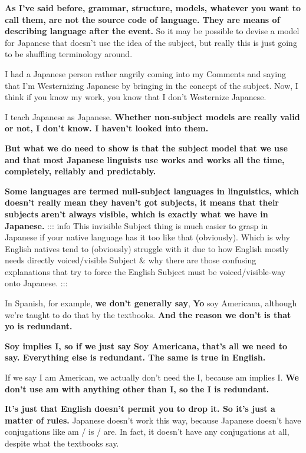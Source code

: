 {\bf As I've said before, grammar, structure, models, whatever you want to call them, are not the source code of language. They are means of describing language after the event.} So it may be possible to devise a model for Japanese that doesn't use the idea of the subject, but really this is just going to be shuffling terminology around.

I had a Japanese person rather angrily coming into my Comments and saying that I'm Westernizing Japanese by bringing in the concept of the subject. Now, I think if you know my work, you know that I don't Westernize Japanese.

I teach Japanese as Japanese. {\bf Whether non-subject models are really valid or not, I don't know. I haven't looked into them.}

{\bf But what we do need to show is that the subject model that we use and that most Japanese linguists use works and works all the time, completely, reliably and predictably.}

\startsectionlevel[title={The Null-Subject},reference={the-null-subject}]

{\bf Some languages are termed null-subject languages in linguistics, which doesn't really mean they haven't got subjects, it means that their subjects aren't always visible, which is exactly what we have in Japanese.} ::: info This invisible Subject thing is much easier to grasp in Japanese if your native language has it too like that (obviously). Which is why English natives tend to (obviously) struggle with it due to how English mostly needs directly voiced/visible Subject & why there are those confusing explanations that try to force the English Subject must be voiced/visible-way onto Japanese. ::: {}

In Spanish, for example, {\bf we don't generally say}, {\bf Yo} soy Americana, although we're taught to do that by the textbooks. {\bf And the reason we don't is that yo is redundant.}

{\bf Soy implies I, so if we just say Soy Americana, that's all we need to say. Everything else is redundant. The same is true in English.}

If we say I am American, we actually don't need the I, because am implies I. {\bf We don't use am with anything other than I, so the I is redundant.}

{\bf It's just that English doesn't permit you to drop it. So it's just a matter of rules.} Japanese doesn't work this way, because Japanese doesn't have conjugations like am / is / are. In fact, it doesn't have any conjugations at all, despite what the textbooks say.

